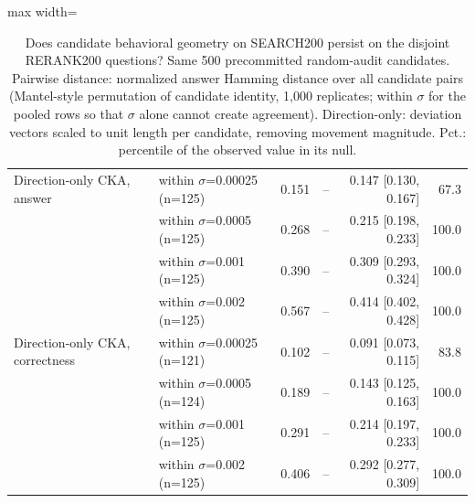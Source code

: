\begin{table}[t]
\begin{adjustbox}{max width=\linewidth}
\begin{tabular}{llrrrr}
Direction-only CKA, answer & within $\sigma$=0.00025 (n=125) & 0.151 & -- & 0.147 [0.130, 0.167] & 67.3 \\
 & within $\sigma$=0.0005 (n=125) & 0.268 & -- & 0.215 [0.198, 0.233] & 100.0 \\
 & within $\sigma$=0.001 (n=125) & 0.390 & -- & 0.309 [0.293, 0.324] & 100.0 \\
 & within $\sigma$=0.002 (n=125) & 0.567 & -- & 0.414 [0.402, 0.428] & 100.0 \\
Direction-only CKA, correctness & within $\sigma$=0.00025 (n=121) & 0.102 & -- & 0.091 [0.073, 0.115] & 83.8 \\
 & within $\sigma$=0.0005 (n=124) & 0.189 & -- & 0.143 [0.125, 0.163] & 100.0 \\
 & within $\sigma$=0.001 (n=125) & 0.291 & -- & 0.214 [0.197, 0.233] & 100.0 \\
 & within $\sigma$=0.002 (n=125) & 0.406 & -- & 0.292 [0.277, 0.309] & 100.0 \\
\bottomrule
\end{tabular}
\end{adjustbox}
\caption{Does candidate behavioral geometry on SEARCH200 persist on the disjoint RERANK200 questions? Same 500 precommitted random-audit candidates. Pairwise distance: normalized answer Hamming distance over all candidate pairs (Mantel-style permutation of candidate identity, 1,000 replicates; within $\sigma$ for the pooled rows so that $\sigma$ alone cannot create agreement). Direction-only: deviation vectors scaled to unit length per candidate, removing movement magnitude. Pct.: percentile of the observed value in its null.}
\label{tab:cross-split}
\end{table}
